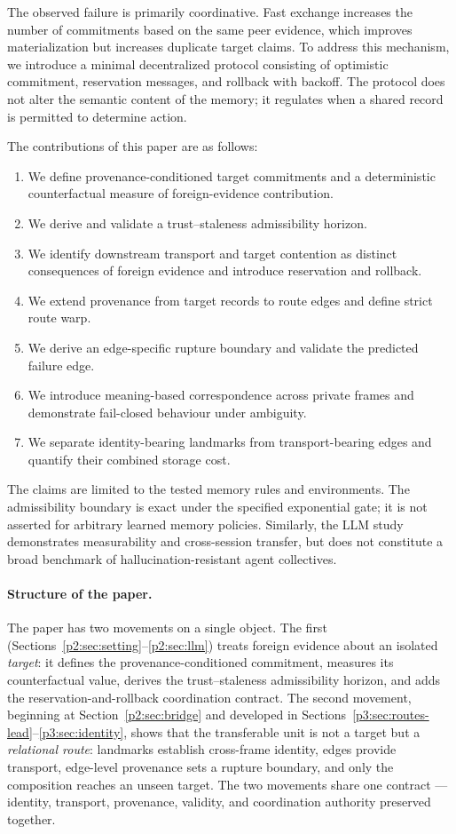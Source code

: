 \documentclass{article}
\begin{document}
The observed failure is primarily coordinative. Fast exchange
increases the number of commitments based on the same peer evidence,
which improves materialization but increases duplicate target claims.
To address this mechanism, we introduce a minimal decentralized
protocol consisting of optimistic commitment, reservation messages,
and rollback with backoff. The protocol does not alter the semantic
content of the memory; it regulates when a shared record is permitted
to determine action.

The contributions of this paper are as follows:
\begin{enumerate}[leftmargin=20pt,itemsep=2pt,topsep=2pt]
\item We define provenance-conditioned target commitments and a
deterministic counterfactual measure of foreign-evidence contribution.
\item We derive and validate a trust--staleness admissibility horizon.
\item We identify downstream transport and target contention as
distinct consequences of foreign evidence and introduce reservation and
rollback.
\item We extend provenance from target records to route edges and
define strict route warp.
\item We derive an edge-specific rupture boundary and validate the
predicted failure edge.
\item We introduce meaning-based correspondence across private frames
and demonstrate fail-closed behaviour under ambiguity.
\item We separate identity-bearing landmarks from transport-bearing
edges and quantify their combined storage cost.
\end{enumerate}

The claims are limited to the tested memory rules and environments.
The admissibility boundary is exact under the specified exponential gate; it is
not asserted for arbitrary learned memory policies. Similarly, the LLM
study demonstrates measurability and cross-session transfer, but does
not constitute a broad benchmark of hallucination-resistant agent
collectives.

\paragraph{Structure of the paper.} The paper has two movements on a
single object. The first (Sections~\ref{p2:sec:setting}--\ref{p2:sec:llm})
treats foreign evidence about an isolated \emph{target}: it defines the
provenance-conditioned commitment, measures its counterfactual value,
derives the trust--staleness admissibility horizon, and adds the
reservation-and-rollback coordination contract. The second movement,
beginning at Section~\ref{p2:sec:bridge} and developed in
Sections~\ref{p3:sec:routes-lead}--\ref{p3:sec:identity}, shows that the transferable unit is
not a target but a \emph{relational route}: landmarks establish
cross-frame identity, edges provide transport, edge-level provenance
sets a rupture boundary, and only the composition reaches an unseen
target. The two movements share one contract --- identity, transport,
provenance, validity, and coordination authority preserved together.
\end{document}
